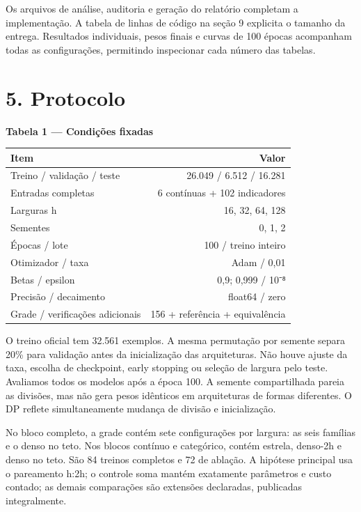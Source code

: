 \documentclass[10pt,a4paper]{article}
\begin{document}
Os arquivos de análise, auditoria e geração do relatório completam a implementação. A tabela de linhas de código na seção 9 explicita o tamanho da entrega. Resultados individuais, pesos finais e curvas de 100 épocas acompanham todas as configurações, permitindo inspecionar cada número das tabelas.


\clearpage

\section*{5. Protocolo}
\noindent\textbf{Tabela 1 — Condições fixadas}

{\footnotesize\setlength{\tabcolsep}{4pt}\begin{center}\begin{tabular}{lr}\toprule
Item & Valor\\\midrule
Treino / validação / teste & 26.049 / 6.512 / 16.281\\
Entradas completas & 6 contínuas + 102 indicadores\\
Larguras h & 16, 32, 64, 128\\
Sementes & 0, 1, 2\\
Épocas / lote & 100 / treino inteiro\\
Otimizador / taxa & Adam / 0,01\\
Betas / epsilon & 0,9; 0,999 / 10⁻⁸\\
Precisão / decaimento & float64 / zero\\
Grade / verificações adicionais & 156 + referência + equivalência\\
\bottomrule\end{tabular}\end{center}}

O treino oficial tem 32.561 exemplos. A mesma permutação por semente separa 20\% para validação antes da inicialização das arquiteturas. Não houve ajuste da taxa, escolha de checkpoint, early stopping ou seleção de largura pelo teste. Avaliamos todos os modelos após a época 100. A semente compartilhada pareia as divisões, mas não gera pesos idênticos em arquiteturas de formas diferentes. O DP reflete simultaneamente mudança de divisão e inicialização.


No bloco completo, a grade contém sete configurações por largura: as seis famílias e o denso no teto. Nos blocos contínuo e categórico, contém estrela, denso-2h e denso no teto. São 84 treinos completos e 72 de ablação. A hipótese principal usa o pareamento h:2h; o controle soma mantém exatamente parâmetros e custo contado; as demais comparações são extensões declaradas, publicadas integralmente.
\end{document}
